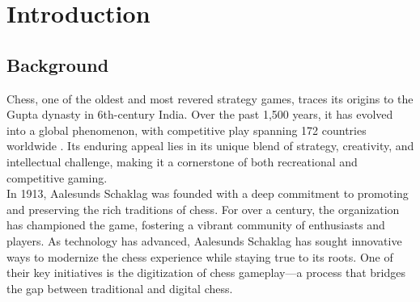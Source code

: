 \chapter{Introduction}

\section{Background}


Chess, one of the oldest and most revered strategy games, traces its origins to the Gupta dynasty in 6th-century India. Over the past 1,500 years, it has evolved into a global phenomenon, with competitive play spanning 172 countries worldwide \cite{artsnculture}. Its enduring appeal lies in its unique blend of strategy, creativity, and intellectual challenge, making it a cornerstone of both recreational and competitive gaming. \\

In 1913, Aalesunds Schaklag was founded with a deep commitment to promoting and preserving the rich traditions of chess. For over a century, the organization has championed the game, fostering a vibrant community of enthusiasts and players. As technology has advanced, Aalesunds Schaklag has sought innovative ways to modernize the chess experience while staying true to its roots. One of their key initiatives is the digitization of chess gameplay—a process that bridges the gap between traditional and digital chess. \\

